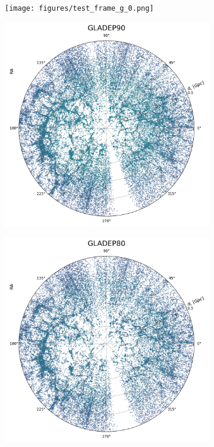 \begin{figure}[h!]
  \centering
  \begin{subfigure}{0.32\textwidth}
    \texttt{[image: figures/test\_frame\_g\_0.png]}
    \label{fig:gladep100}
  \end{subfigure}
  \begin{subfigure}{0.32\textwidth}
    \includegraphics[width=\linewidth]{figures/test_frame_g_1.png}
    \label{fig:gladep90}
  \end{subfigure}
  \begin{subfigure}{0.32\textwidth}
    \includegraphics[width=\linewidth]{figures/test_frame_g_2.png}

\end{subfigure}
\end{figure}
